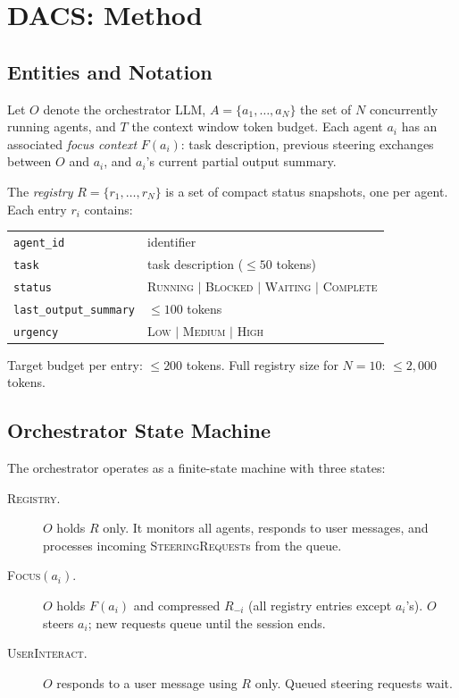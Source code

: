 \documentclass{article}
\begin{document}
\section{DACS: Method}
\label{sec:mechanism}

\subsection{Entities and Notation}
\label{sec:notation}

Let $O$ denote the orchestrator LLM, $A = \{a_1, \ldots, a_N\}$ the set
of $N$ concurrently running agents, and $T$ the context window token
budget.
Each agent $a_i$ has an associated \emph{focus context}
$F(a_i)$: task description, previous steering exchanges between $O$ and
$a_i$, and $a_i$'s current partial output summary.

The \emph{registry} $R = \{r_1, \ldots, r_N\}$ is a set of compact status
snapshots, one per agent.
Each entry $r_i$ contains:

\begin{center}
\begin{tabular}{ll}
\texttt{agent\_id} & identifier \\
\texttt{task} & task description ($\leq 50$ tokens) \\
\texttt{status} & \textsc{Running} $|$ \textsc{Blocked} $|$ \textsc{Waiting} $|$ \textsc{Complete} \\
\texttt{last\_output\_summary} & $\leq 100$ tokens \\
\texttt{urgency} & \textsc{Low} $|$ \textsc{Medium} $|$ \textsc{High} \\
\end{tabular}
\end{center}

Target budget per entry: $\leq 200$ tokens.
Full registry size for $N{=}10$: $\leq 2{,}000$ tokens.

\subsection{Orchestrator State Machine}
\label{sec:fsm}

The orchestrator operates as a finite-state machine with three states:

\begin{description}
  \item[\textsc{Registry}.] $O$ holds $R$ only.
  It monitors all agents, responds to user messages, and processes
  incoming \textsc{SteeringRequest}s from the queue.

  \item[\textsc{Focus}$(a_i)$.] $O$ holds $F(a_i)$ and compressed
  $R_{-i}$ (all registry entries except $a_i$'s).
  $O$ steers $a_i$; new requests queue until the session ends.

  \item[\textsc{UserInteract}.] $O$ responds to a user message using $R$
  only. Queued steering requests wait.
\end{description}
\end{document}
